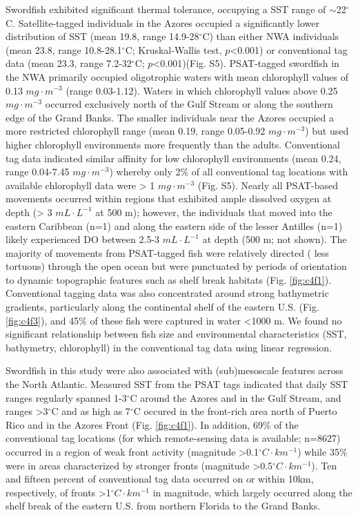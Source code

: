 Swordfish exhibited significant thermal tolerance, occupying a SST range of $\sim$22$^{\circ}$C. Satellite-tagged individuals in the Azores occupied a significantly lower distribution of SST (mean 19.8, range 14.9-28$^{\circ}$C) than either NWA individuals (mean 23.8, range 10.8-28.1$^{\circ}$C; Kruskal-Wallis test, \(p\)<0.001) or conventional tag data (mean 23.3, range 7.2-32$^{\circ}$C; \(p\)<0.001)(Fig. S5). PSAT-tagged swordfish in the NWA primarily occupied oligotrophic waters with mean chlorophyll values of 0.13 \(mg \cdot m^{-3}\) (range 0.03-1.12). Waters in which chlorophyll values above 0.25 \(mg \cdot m^{-3}\) occurred exclusively north of the Gulf Stream or along the southern edge of the Grand Banks. The smaller individuals near the Azores occupied a more restricted chlorophyll range (mean 0.19, range 0.05-0.92 \(mg \cdot m^{-3}\)) but used higher chlorophyll environments more frequently than the adults. Conventional tag data indicated similar affinity for low chlorophyll environments (mean 0.24, range 0.04-7.45 $mg \cdot m^{-3}$) whereby only 2\% of all conventional tag locations with available chlorophyll data were > 1 \(mg \cdot m^{-3}\) (Fig. S5). Nearly all PSAT-based movements occurred within regions that exhibited ample dissolved oxygen at depth (> 3 \(mL \cdot L^{-1}\) at 500 m); however, the individuals that moved into the eastern Caribbean (n=1) and along the eastern side of the lesser Antilles (n=1) likely experienced DO between 2.5-3 \(mL \cdot L^{-1}\) at depth (500 m; not shown). The majority of movements from PSAT-tagged fish were relatively directed ( less tortuous) through the open ocean but were punctuated by periods of orientation to dynamic topographic features such as shelf break habitats (Fig. \ref{fig:c4f1}). Conventional tagging data was also concentrated around strong bathymetric gradients, particularly along the continental shelf of the eastern U.S. (Fig. \ref{fig:c4f3}), and 45\% of these fish were captured in water <1000 m. We found no significant relationship between fish size and environmental characteristics (SST, bathymetry, chlorophyll) in the conventional tag data using linear regression.

Swordfish in this study were also associated with (sub)mesoscale features across the North Atlantic. Measured SST from the PSAT tags indicated that daily SST ranges regularly spanned 1-3$^{\circ}$C around the Azores and in the Gulf Stream, and ranges >3$^{\circ}$C and as high as 7$^{\circ}$C occured in the front-rich area north of Puerto Rico and in the Azores Front (Fig. \ref{fig:c4f1}). In addition, 69\% of the conventional tag locations (for which remote-sensing data is available; n=8627) occurred in a region of weak front activity (magnitude >0.1$^{\circ}C \cdot km ^{-1}$) while 35\% were in areas characterized by stronger fronts (magnitude >0.5$^{\circ}C \cdot km ^{-1}$). Ten and fifteen percent of conventional tag data occurred on or within 10km, respectively, of fronts >1$^{\circ}C \cdot km ^{-1}$ in magnitude, which largely occurred along the shelf break of the eastern U.S. from northern Florida to the Grand Banks.

